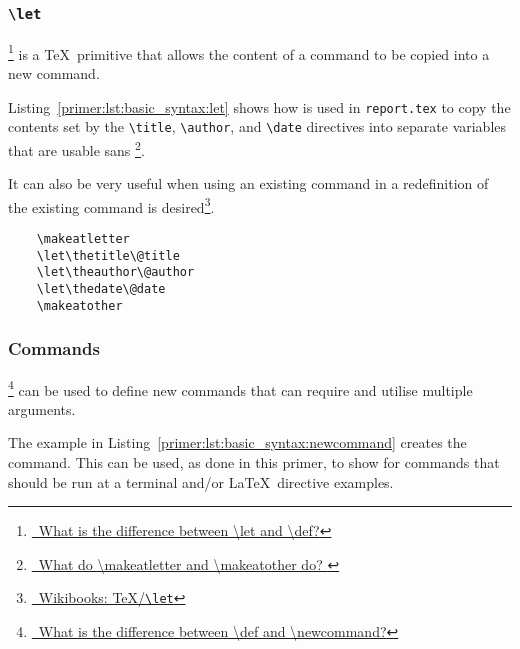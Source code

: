\subsubsection{\texttt{\textbackslash let}}
\footnote{\href{https://tex.stackexchange.com/questions/258/what-is-the-difference-between-let-and-def}{\faStackExchange\ What is the difference between \textbackslash let and \textbackslash def?}} is a \TeX\ primitive that allows the content of a command to be copied into a new command.

Listing~\ref{primer:lst:basic_syntax:let} shows how  is used in \texttt{report.tex} to copy the contents set by the \texttt{\textbackslash title}, \texttt{\textbackslash author}, and \texttt{\textbackslash date} directives into separate variables that are usable sans \footnote{\href{https://tex.stackexchange.com/questions/8351/what-do-makeatletter-and-makeatother-do}{\faStackExchange\ What do \textbackslash makeatletter and \textbackslash makeatother do?
}}.

It can also be very useful when using an existing command in a redefinition of the existing command is desired\footnote{\href{https://en.wikibooks.org/wiki/TeX/let}{\faBook\ Wikibooks: \TeX{}/\texttt{\textbackslash let}}}.

\begin{listing}[H]
  \captionsetup{skip=\skiplistingcaptionlen}
  \begin{verbatim}
    \makeatletter
    \let\thetitle\@title
    \let\theauthor\@author
    \let\thedate\@date
    \makeatother
  \end{verbatim}
  \caption{\texttt{\textbackslash let} command example}
  \label{primer:lst:basic_syntax:let}
\end{listing}

\pagebreak
\subsubsection{Commands}
\footnote{\href{https://tex.stackexchange.com/questions/655/what-is-the-difference-between-def-and-newcommand}{\faStackExchange\ What is the difference between \textbackslash def and \textbackslash newcommand?}} can be used to define new commands that can require and utilise multiple arguments.

The example in Listing~\ref{primer:lst:basic_syntax:newcommand} creates the  command. This can be used, as done in this primer, to show  for commands that should be run at a terminal and/or \LaTeX\ directive examples.

